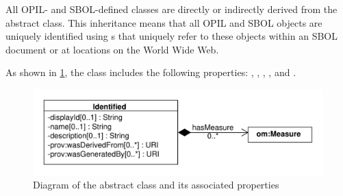 All OPIL- and SBOL-defined classes are directly or indirectly derived from the   abstract class.
This inheritance means that all OPIL and SBOL objects are uniquely identified using s that uniquely refer to these objects within an SBOL document or at locations on the World Wide Web.

As shown in \ref{uml:identified}, the  class includes the following properties: ,  , , , and . 

\begin{figure}[ht]
\begin{center}
\includegraphics[scale=0.6]{sbol_uml/identified}
\caption[]{Diagram of the  abstract class and its associated properties}
\label{uml:identified}
\end{center}
\end{figure}


